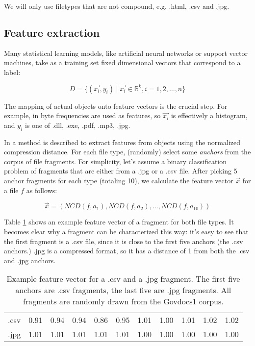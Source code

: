 We will only use filetypes that are not compound, e.g. .html, .csv and
.jpg.

\subsection{Feature extraction}

Many statistical learning models, like artificial neural networks or
support vector machines, take as a training set fixed dimensional
vectors that correspond to a label:

\begin{equation}
  D = \{ (\vec{x_{i}}, y_{i}) \mid \vec{x_{i}} \in \mathbb{R}^{k}, i = 1, 2, \dots, n \}
\end{equation}

The mapping of actual objects onto feature vectors is the crucial step.
For example, in \cite{Li2010} byte frequencies are used as features, so
$\vec{x_{i}}$ is effectively a histogram, and $y_{i}$ is one of .dll,
.exe, .pdf, .mp3, .jpg. 

In \cite{Cilibrasi2007} a method is described to extract features from
objects using the normalized compression distance. For each file type,
(randomly) select some \emph{anchors} from the corpus of file fragments.
For simplicity, let's assume a binary classification problem of fragments
that are either from a .jpg or a .csv file. After picking 5 anchor
fragments for each type (totaling 10), we calculate the feature vector $\vec{x}$ for a file $f$ as follows:

\begin{equation}\label{}
  \vec{x} = ( NCD(f, a_{1}), NCD(f, a_{2}), \dots, NCD(f, a_{10}) )
\end{equation}

Table \ref{table:feature_vectors} shows an example feature vector of
a fragment for both file types. It becomes clear why a fragment can be
characterized this way: it's easy to see that the first fragment is a .csv
file, since it is close to the first five anchors (the .csv anchors.) .jpg
is a compressed format, so it has a distance of 1 from both the .csv and
.jpg anchors.

\begin{table}
\begin{tabular}{lrrrrrrrrrr}
\hline
 .csv & 0.91 & 0.94 & 0.94 & 0.86 & 0.95 & 1.01 & 1.00 & 1.01 & 1.02 & 1.02 \\
 .jpg & 1.01 & 1.01 & 1.01 & 1.01 & 1.01 & 1.00 & 1.00 & 1.00 & 1.00 & 1.00 \\
\hline
\end{tabular} \caption{Example feature vector for a .csv and a .jpg
fragment. The first five anchors are .csv fragments, the last five are
.jpg fragments. All fragments are randomly drawn from the Govdocs1
corpus.} \label{table:feature_vectors} \end{table}

